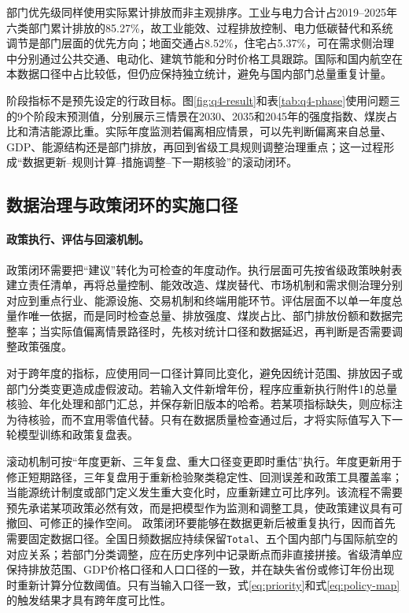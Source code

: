 \documentclass[12pt,a4paper]{ctexart}
\theoremstyle{definition}
\theoremstyle{plain}
\theoremstyle{remark}
\begin{document}
部门优先级同样使用实际累计排放而非主观排序。工业与电力合计占2019--2025年六类部门累计排放的85.27\%，故工业能效、过程排放控制、电力低碳替代和系统调节是部门层面的优先方向；地面交通占8.52\%，住宅占5.37\%，可在需求侧治理中分别通过公共交通、电动化、建筑节能和分时价格工具跟踪。国际和国内航空在本数据口径中占比较低，但仍应保持独立统计，避免与国内部门总量重复计量。

阶段指标不是预先设定的行政目标。图\ref{fig:q4-result}和表\ref{tab:q4-phase}使用问题三的9个阶段末预测值，分别展示三情景在2030、2035和2045年的强度指数、煤炭占比和清洁能源比重。实际年度监测若偏离相应情景，可以先判断偏离来自总量、GDP、能源结构还是部门排放，再回到省级工具规则调整治理重点；这一过程形成“数据更新--规则计算--措施调整--下一期核验”的滚动闭环。
\subsection{数据治理与政策闭环的实施口径}\paragraph{政策执行、评估与回滚机制。}
政策闭环需要把“建议”转化为可检查的年度动作。执行层面可先按省级政策映射表建立责任清单，再将总量控制、能效改造、煤炭替代、市场机制和需求侧治理分别对应到重点行业、能源设施、交易机制和终端用能环节。评估层面不以单一年度总量作唯一依据，而是同时检查总量、排放强度、煤炭占比、部门排放份额和数据完整率；当实际值偏离情景路径时，先核对统计口径和数据延迟，再判断是否需要调整政策强度。

对于跨年度的指标，应使用同一口径计算同比变化，避免因统计范围、排放因子或部门分类变更造成虚假波动。若输入文件新增年份，程序应重新执行附件1的总量核验、年化处理和部门汇总，并保存新旧版本的哈希。若某项指标缺失，则应标注为待核验，而不宜用零值代替。只有在数据质量检查通过后，才将实际值写入下一轮模型训练和政策复盘表。

滚动机制可按“年度更新、三年复盘、重大口径变更即时重估”执行。年度更新用于修正短期路径，三年复盘用于重新检验聚类稳定性、回测误差和政策工具覆盖率；当能源统计制度或部门定义发生重大变化时，应重新建立可比序列。该流程不需要预先承诺某项政策必然有效，而是把模型作为监测和调整工具，使政策建议具有可撤回、可修正的操作空间。
政策闭环要能够在数据更新后被重复执行，因而首先需要固定数据口径。全国日频数据应持续保留\texttt{Total}、五个国内部门与国际航空的对应关系；若部门分类调整，应在历史序列中记录断点而非直接拼接。省级清单应保持排放范围、GDP价格口径和人口口径的一致，并在缺失省份或修订年份出现时重新计算分位数阈值。只有当输入口径一致，式\eqref{eq:priority}和式\eqref{eq:policy-map}的触发结果才具有跨年度可比性。
\end{document}
